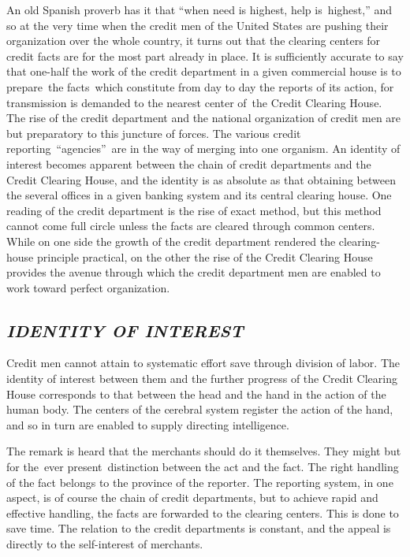 \documentclass[twoside,symmetric,nobib,justified]{tufte-book}
\begin{document}
\enlargethispage{\baselineskip}

An old Spanish proverb has it that ``when need is highest, help
is~highest,'' and so at the very time when the credit men of the United
States are pushing their organization over the whole country, it turns
out that the clearing centers for credit facts are for the most part
already in place. It is sufficiently accurate to say that one-half the
work of the credit department in a given commercial house is to
prepare~the facts~which constitute from day to day the reports of its
action, for transmission is demanded to the nearest center of~the Credit
Clearing House. The rise of the credit department and the national
organization of credit men are but preparatory to this juncture of
forces. The various credit reporting~``agencies''~are in the way of
merging into one organism. An identity of interest becomes apparent
between the chain of credit departments and the Credit Clearing House,
and the identity is as absolute as that obtaining between the several
offices in a given banking system and its central clearing house. One
reading of the credit department is the rise of exact method, but this
method cannot come full circle unless the facts are cleared through
common centers. While on one side the growth of the credit department
rendered the clearing-house principle practical, on the other the rise
of the Credit Clearing House provides the avenue through which the
credit department men are enabled to work toward perfect organization.~

\hypertarget{identity-of-interest}{%
\subsection{\texorpdfstring{\emph{IDENTITY OF
INTEREST}}{IDENTITY OF INTEREST}}\label{identity-of-interest}}

Credit men cannot attain to systematic effort save through division of
labor. The identity of interest between them and the further progress of
the Credit Clearing House corresponds to that between the head and the
hand in the action of the human body. The centers of the cerebral system
register the action of the hand, and so in turn are enabled to supply
directing intelligence.~

The remark is heard that the merchants should do it themselves. They
might but for the~ever present~distinction between the act and the fact.
The right handling of the fact belongs to the province of the reporter.
The reporting system, in one aspect, is of course the chain of credit
departments, but to achieve rapid and effective handling, the facts are
forwarded to the clearing centers. This is done to save time. The
relation to the credit departments is constant, and the appeal is
directly to the self-interest of merchants.~
\end{document}
